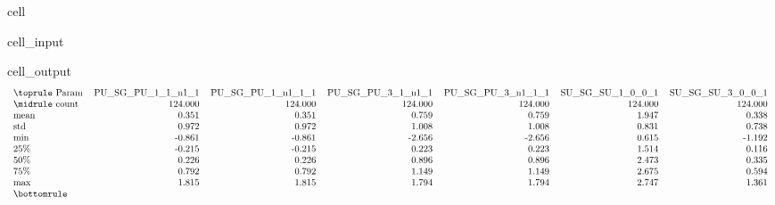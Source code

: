 \documentclass[letterpaper,table,10pt,english]{jupyterBook}
\begin{document}
\begin{sphinxuseclass}{cell}\begin{sphinxVerbatimInput}

\begin{sphinxuseclass}{cell_input}
\begin{sphinxVerbatim}[commandchars=\\\{\}]
\PYG{p}{[}\PYG{p}{]}
\end{sphinxVerbatim}

\end{sphinxuseclass}\end{sphinxVerbatimInput}
\begin{sphinxVerbatimOutput}

\begin{sphinxuseclass}{cell_output}\begin{equation*}
\begin{split}\begin{tabular}{lrrrrrr}
\toprule
Param &  PU\_SG\_PU\_1\_1\_n1\_1 &  PU\_SG\_PU\_1\_n1\_1\_1 &  PU\_SG\_PU\_3\_1\_n1\_1 &  PU\_SG\_PU\_3\_n1\_1\_1 &  SU\_SG\_SU\_1\_0\_0\_1 &  SU\_SG\_SU\_3\_0\_0\_1 \\
\midrule
count &            124.000 &            124.000 &            124.000 &            124.000 &           124.000 &           124.000 \\
mean  &              0.351 &              0.351 &              0.759 &              0.759 &             1.947 &             0.338 \\
std   &              0.972 &              0.972 &              1.008 &              1.008 &             0.831 &             0.738 \\
min   &             -0.861 &             -0.861 &             -2.656 &             -2.656 &             0.615 &            -1.192 \\
25\%   &             -0.215 &             -0.215 &              0.223 &              0.223 &             1.514 &             0.116 \\
50\%   &              0.226 &              0.226 &              0.896 &              0.896 &             2.473 &             0.335 \\
75\%   &              0.792 &              0.792 &              1.149 &              1.149 &             2.675 &             0.594 \\
max   &              1.815 &              1.815 &              1.794 &              1.794 &             2.747 &             1.361 \\
\bottomrule
\end{tabular}\end{split}
\end{equation*}
\end{sphinxuseclass}\end{sphinxVerbatimOutput}

\end{sphinxuseclass}
\end{document}
